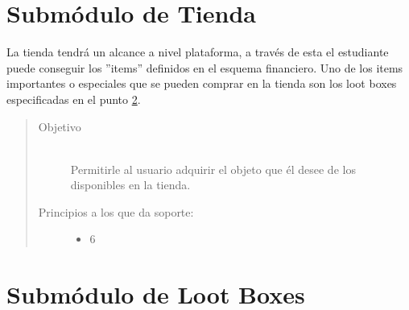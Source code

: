 \section{Submódulo de Tienda}

    La tienda tendrá un alcance a nivel plataforma, a través de esta el estudiante puede conseguir los ''items'' definidos en el esquema financiero. Uno de los items importantes o especiales que se pueden comprar en la tienda son los loot boxes especificadas en el punto \ref{herr:lootBoxes}.

    \begin{quote}
    \begin{description}
    \item[Objetivo] \hfill\\
        Permitirle al usuario adquirir el objeto que él desee de los disponibles en la tienda.

    \item[Principios a los que da soporte:] \hfill
        \begin{itemize}
            \item 6 \principioVI
        \end{itemize}
    \end{description}
    \end{quote}

\section{Submódulo de Loot Boxes}
\label{herr:lootBoxes}

\begin{comment}
    Cada Loot Box desbloquea 4 objetos de la siguiente lista para el usuario:
    \begin{itemize}
        \item Apodo - Objeto de personalización
        \item Tema (Color) - Objeto de personalización
        \item Tema (Patron) - Objeto de personalización
        \item Imagen de perfil - Objeto de personalización
        \item Loot Box
        \item Cierta cantidad de monedas de oro y/o plata
    \end{itemize}
\end{comment}

